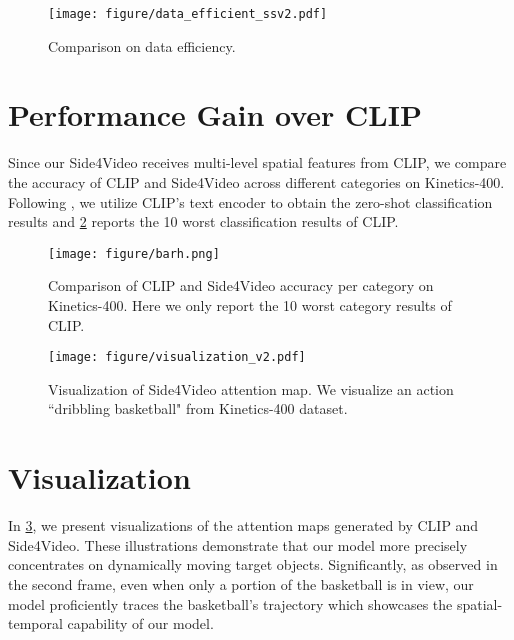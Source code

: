\documentclass[10pt,twocolumn,letterpaper]{article}
\begin{document}
\begin{figure}[h]
    \centering
    \texttt{[image: figure/data\_efficient\_ssv2.pdf]}
    \caption{Comparison on data efficiency.}
    \label{fig:data efficiency}
\end{figure}




\section{Performance Gain over CLIP}
Since our Side4Video receives multi-level spatial features from CLIP, we compare the accuracy of CLIP and Side4Video across different categories on Kinetics-400. Following \cite{wu2023transferring}, we utilize CLIP's text encoder to obtain the zero-shot classification results and \cref{fig: acc per category} reports the 10 worst classification results of CLIP. 





\begin{figure}[t]
    \centering
    \texttt{[image: figure/barh.png]}
    \caption{Comparison of CLIP and Side4Video accuracy per category on Kinetics-400. Here we only report the 10 worst category results of CLIP.}
    \label{fig: acc per category}
\end{figure}


\begin{figure}[t]
    \centering
    \texttt{[image: figure/visualization\_v2.pdf]}
    \caption{Visualization of Side4Video attention map. We visualize an action ``dribbling basketball" from Kinetics-400 dataset.}
    \label{fig:visualization}
\end{figure}

\section{Visualization}
In \cref{fig:visualization}, we present visualizations of the attention maps generated by CLIP and Side4Video. These illustrations demonstrate that our model more precisely concentrates on dynamically moving target objects. Significantly, as observed in the second frame, even when only a portion of the basketball is in view, our model proficiently traces the basketball's trajectory which showcases the spatial-temporal capability of our model.
\end{document}
